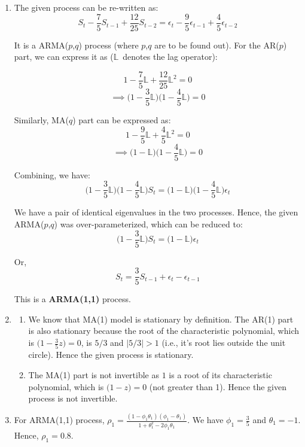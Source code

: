 \documentclass[12pt, oneside]{article}
\begin{document}
\begin{enumerate}
\begin{enumerate}
\item 

The given process can be re-written as:
\[ S_t -\frac{7}{5} S_{t-1} + \frac{12}{25} S_{t-2} = \epsilon_t - \frac{9}{5} \epsilon_{t-1} + \frac{4}{5} \epsilon_{t-2} \]

It is a ARMA($p$,$q$) process (where $p$,$q$ are to be found out). For the AR($p$) part, we can express it as ($\mathbb{L}$\ denotes the lag operator):

\[ 1 - \frac{7}{5} \mathbb{L} + \frac{12}{25} \mathbb{L}^2 = 0 \]
\[ \implies \bigg(1 - \frac{3}{5}\mathbb{L} \bigg) \bigg(1- \frac{4}{5}\mathbb{L}  \bigg) = 0  \] 

Similarly, MA($q$) part can be expressed as:
\[ 1 - \frac{9}{5}\mathbb{L} + \frac{4}{5} \mathbb{L}^2 = 0 \]
\[ \implies \bigg(1 - \mathbb{L} \bigg) \bigg(1- \frac{4}{5}\mathbb{L}  \bigg) = 0  \] 

Combining, we have:
\[ \bigg(1 - \frac{3}{5}\mathbb{L} \bigg) \bigg(1- \frac{4}{5}\mathbb{L}  \bigg)S_t = \bigg(1 - \mathbb{L} \bigg) \bigg(1- \frac{4}{5}\mathbb{L}  \bigg) \epsilon_t \]

We have a pair of identical eigenvalues in the two processes. Hence, the given ARMA($p$,$q$) was over-parameterized, which can be reduced to:
\[ \bigg(1 - \frac{3}{5}\mathbb{L} \bigg) S_t = \bigg(1 - \mathbb{L} \bigg) \epsilon_t \]

Or,
\[ S_t =  \frac{3}{5}S_{t-1} + \epsilon_t -  \epsilon_{t-1} \]

This is a \textbf{ARMA(1,1)} process.

\item
\begin{enumerate}
\item 

We know that MA(1) model is stationary by definition. The AR(1) part is also stationary because the root of the characteristic polynomial, which is $\big(1 - \frac{3}{5}z \big ) = 0$, is $5/3$ and $|5/3|>1$ (i.e., it's root lies outside the unit circle). Hence the given process is stationary.
\item
The MA(1) part is not invertible as $1$ is a root of its characteristic polynomial, which is $\big(1 - z \big) = 0$ (not greater than 1). Hence the given process is not invertible.
\end{enumerate}
\item
For ARMA(1,1) process, $\rho_1 = \frac{(1-\phi_1\theta_1)(\phi_1-\theta_1) }{1+\theta_1^2 -2\phi_1\theta_1}$. We have $\phi_1 =  \frac{3}{5}$ and $\theta_1 = -1$. Hence, $\rho_1=0.8$.


\end{enumerate}
\end{enumerate}
\end{document}
